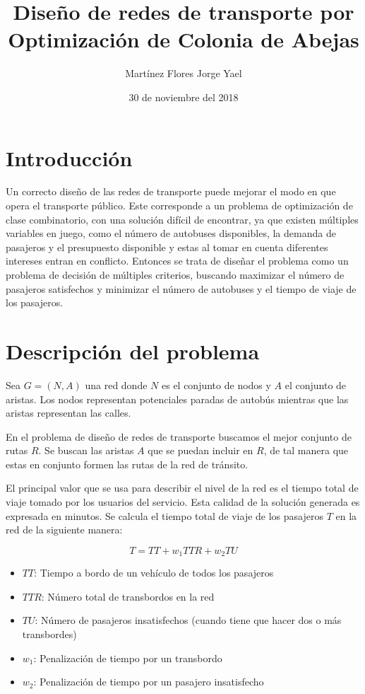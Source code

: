 \documentclass[letterpaper,12pt]{article}
\begin{document}
\title{Diseño de redes de transporte por Optimización de Colonia de Abejas}
\author{Martínez Flores Jorge Yael}
\date{30 de noviembre del 2018}
\maketitle

\section{Introducción}

Un correcto diseño de las redes de transporte puede mejorar el  modo en que 
opera el transporte público. Este corresponde a un problema de optimización 
de clase combinatorio, con una solución difícil de encontrar, ya que existen 
múltiples variables en juego, como el número de autobuses disponibles, la 
demanda de pasajeros y el presupuesto disponible y estas al tomar en cuenta 
diferentes intereses entran en conflicto. Entonces se trata de diseñar el 
problema como  un problema de decisión de múltiples criterios, buscando 
maximizar el número de pasajeros satisfechos y minimizar el número de autobuses 
y el tiempo de viaje de los pasajeros.

\section{Descripción del problema} 

Sea $G=(N,A)$ una red donde $N$ es el conjunto de nodos y $A$ el conjunto de 
aristas. Los nodos representan potenciales paradas de autobús mientras que 
las aristas representan las calles.

En el problema de diseño de redes de transporte buscamos el mejor conjunto de 
rutas $R$. Se buscan las aristas $A$ que se puedan incluir en $R$, de tal manera
que estas en conjunto formen las rutas de la red de tránsito.

El principal valor que se usa para describir el nivel de la red es el tiempo 
total de viaje tomado por los usuarios del servicio. Esta calidad de la 
solución generada es expresada en minutos. Se calcula el tiempo total de 
viaje de los pasajeros $T$ en la red de la siguiente manera:

$$ T = TT + w_1TTR + w_2 TU $$

\begin{itemize}
    \itemsep0em 
    \item $TT$: Tiempo a bordo de un vehículo de todos los pasajeros
    \item $TTR$: Número total de transbordos en la red
    \item $TU$: Número de pasajeros insatisfechos (cuando tiene que hacer dos o
    más transbordes)
    \item $w_1$: Penalización de tiempo por un transbordo
    \item $w_2$: Penalización de tiempo por un pasajero insatisfecho
\end{itemize}
\end{document}
